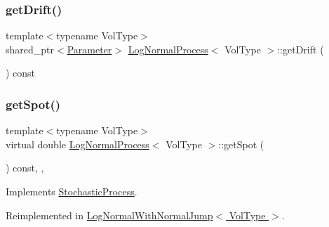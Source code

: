\subsubsection{\texorpdfstring{get\+Drift()}{getDrift()}\hspace{0.1cm}{\footnotesize\ttfamily [2/2]}}
{\footnotesize\ttfamily template$<$typename Vol\+Type$>$ \\
shared\+\_\+ptr$<$\hyperlink{class_parameter}{Parameter}$>$ \hyperlink{class_log_normal_process}{Log\+Normal\+Process}$<$ Vol\+Type $>$\+::get\+Drift (\begin{DoxyParamCaption}{ }\end{DoxyParamCaption}) const\hspace{0.3cm}{\ttfamily [inline]}}

\hypertarget{class_log_normal_process_a2c01b829c59e9b6156f0e34b3632c800}{}\label{class_log_normal_process_a2c01b829c59e9b6156f0e34b3632c800} 
\subsubsection{\texorpdfstring{get\+Spot()}{getSpot()}}
{\footnotesize\ttfamily template$<$typename Vol\+Type$>$ \\
virtual double \hyperlink{class_log_normal_process}{Log\+Normal\+Process}$<$ Vol\+Type $>$\+::get\+Spot (\begin{DoxyParamCaption}{ }\end{DoxyParamCaption}) const\hspace{0.3cm}{\ttfamily [inline]}, {\ttfamily [override]}, {\ttfamily [virtual]}}



Implements \hyperlink{class_stochastic_process_aad2ef51ca4bc2fe5f33a73e8f0ee361e}{Stochastic\+Process}.



Reimplemented in \hyperlink{class_log_normal_with_normal_jump_a7a6cd6409ac252d9c68ecbc36e135fb5}{Log\+Normal\+With\+Normal\+Jump$<$ Vol\+Type $>$}.

\hypertarget{class_log_normal_process_af2d153f75cd5efbeaa3a9028585dd835}{}\label{class_log_normal_process_af2d153f75cd5efbeaa3a9028585dd835} 
